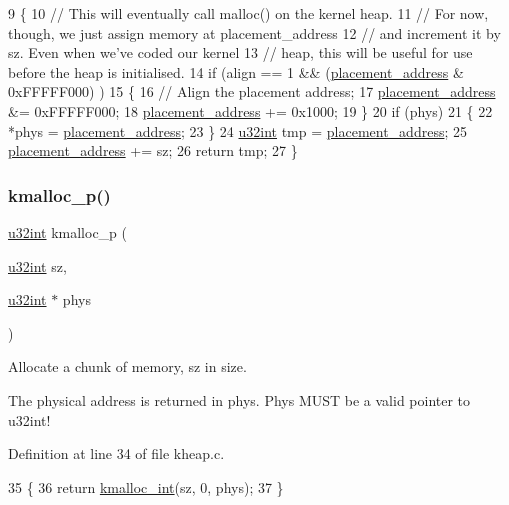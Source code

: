\begin{DoxyCode}
9 \{
10     \textcolor{comment}{// This will eventually call malloc() on the kernel heap.}
11     \textcolor{comment}{// For now, though, we just assign memory at placement\_address}
12     \textcolor{comment}{// and increment it by sz. Even when we've coded our kernel}
13     \textcolor{comment}{// heap, this will be useful for use before the heap is initialised.}
14     \textcolor{keywordflow}{if} (align == 1 && (\hyperlink{a00071_a9df9c77e08423957a655e27605284987_a9df9c77e08423957a655e27605284987}{placement\_address} & 0xFFFFF000) )
15     \{
16         \textcolor{comment}{// Align the placement address;}
17         \hyperlink{a00071_a9df9c77e08423957a655e27605284987_a9df9c77e08423957a655e27605284987}{placement\_address} &= 0xFFFFF000;
18         \hyperlink{a00071_a9df9c77e08423957a655e27605284987_a9df9c77e08423957a655e27605284987}{placement\_address} += 0x1000;
19     \}
20     \textcolor{keywordflow}{if} (phys)
21     \{
22         *phys = \hyperlink{a00071_a9df9c77e08423957a655e27605284987_a9df9c77e08423957a655e27605284987}{placement\_address};
23     \}
24     \hyperlink{a00125_a7ae3a26c17ddfe117c6291739780801d_a7ae3a26c17ddfe117c6291739780801d}{u32int} tmp = \hyperlink{a00071_a9df9c77e08423957a655e27605284987_a9df9c77e08423957a655e27605284987}{placement\_address};
25     \hyperlink{a00071_a9df9c77e08423957a655e27605284987_a9df9c77e08423957a655e27605284987}{placement\_address} += sz;
26     \textcolor{keywordflow}{return} tmp;
27 \}
\end{DoxyCode}
\mbox{\label{a00074_ac688411503d5934c65d6c5c1ef204d81_ac688411503d5934c65d6c5c1ef204d81}} 
\subsubsection{\texorpdfstring{kmalloc\+\_\+p()}{kmalloc\_p()}}
{\footnotesize\ttfamily \hyperlink{a00125_a7ae3a26c17ddfe117c6291739780801d_a7ae3a26c17ddfe117c6291739780801d}{u32int} kmalloc\+\_\+p (\begin{DoxyParamCaption}\item[{\hyperlink{a00125_a7ae3a26c17ddfe117c6291739780801d_a7ae3a26c17ddfe117c6291739780801d}{u32int}}]{sz,  }\item[{\hyperlink{a00125_a7ae3a26c17ddfe117c6291739780801d_a7ae3a26c17ddfe117c6291739780801d}{u32int} $\ast$}]{phys }\end{DoxyParamCaption})}



Allocate a chunk of memory, sz in size. 

The physical address is returned in phys. Phys M\+U\+ST be a valid pointer to u32int! 

Definition at line 34 of file kheap.\+c.


\begin{DoxyCode}
35 \{
36     \textcolor{keywordflow}{return} \hyperlink{a00071_a8b976e8a7e805ef85fcfa68b9b9bbd63_a8b976e8a7e805ef85fcfa68b9b9bbd63}{kmalloc\_int}(sz, 0, phys);
37 \}
\end{DoxyCode}
